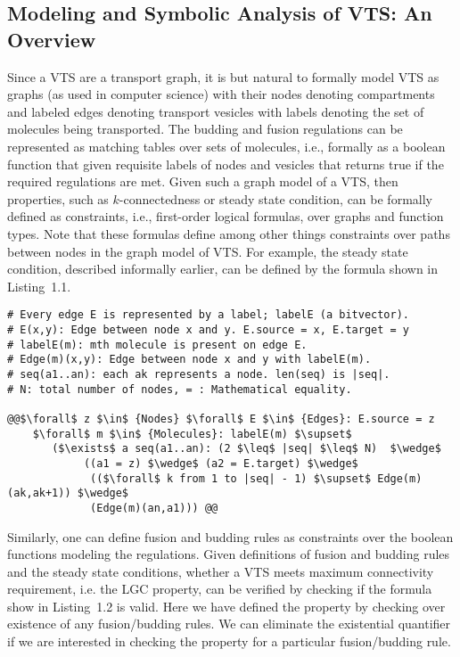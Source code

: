 \subsection{Modeling and Symbolic Analysis of VTS: An Overview}
\label{subsec:graphmodel}
Since a VTS are a transport graph, it is but natural to formally model VTS as graphs (as used in computer science) with their nodes denoting compartments and labeled edges denoting transport vesicles with labels denoting the set of molecules being transported.  The budding and fusion regulations can be represented as matching tables over sets of molecules, i.e., formally as a boolean function that given requisite labels of nodes and vesicles that returns true if the required regulations are met.  Given such a graph model of a VTS, then properties, such as $k$-connectedness or steady state condition, can be formally defined as constraints, i.e., first-order logical formulas, over graphs and function types.  Note that these formulas define among other things constraints over paths between nodes in the graph model of VTS.  For example, the steady state condition, described informally earlier, can be defined by the formula shown in Listing~1.1.

\begin{lstlisting}[mathescape,
 breaklines,
  rulecolor=\color{black},
  frame=single,
  caption= \textbf{Steady state specification.},
  moredelim={[is][keywordstyle]{@@}{@@}}
]
# Every edge E is represented by a label; labelE (a bitvector).
# E(x,y): Edge between node x and y. E.source = x, E.target = y    
# labelE(m): mth molecule is present on edge E.
# Edge(m)(x,y): Edge between node x and y with labelE(m).                 
# seq(a1..an): each ak represents a node. len(seq) is |seq|.
# N: total number of nodes, = : Mathematical equality.
 
@@$\forall$ z $\in$ {Nodes} $\forall$ E $\in$ {Edges}: E.source = z
    $\forall$ m $\in$ {Molecules}: labelE(m) $\supset$
       ($\exists$ a seq(a1..an): (2 $\leq$ |seq| $\leq$ N)  $\wedge$
            ((a1 = z) $\wedge$ (a2 = E.target) $\wedge$
             (($\forall$ k from 1 to |seq| - 1) $\supset$ Edge(m)(ak,ak+1)) $\wedge$
             (Edge(m)(an,a1))) @@

\end{lstlisting}    

Similarly, one can define fusion and budding rules as constraints over the boolean functions modeling the regulations.  Given definitions of fusion and budding rules and the steady state conditions, whether a VTS meets maximum connectivity requirement, i.e. the LGC property, can be verified by checking if the formula show in Listing~1.2 is valid.  Here we have defined the property by checking over existence of any fusion/budding rules.  We can eliminate the existential quantifier if we are interested in checking the property for a particular fusion/budding rule.

